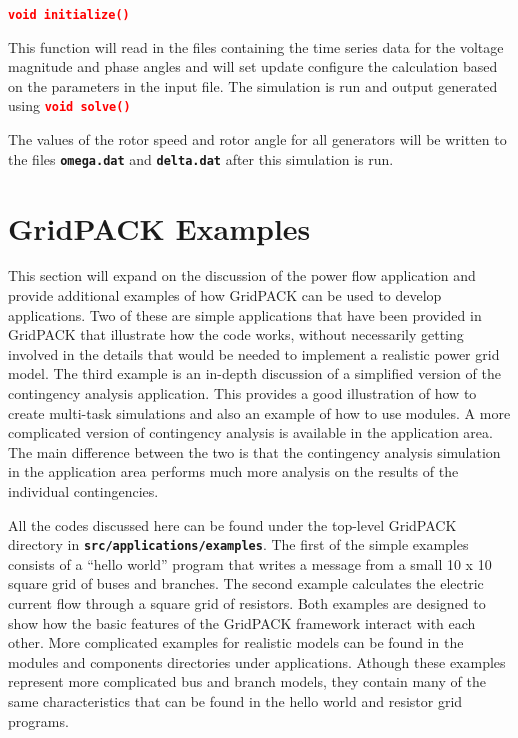 \documentclass[12pt]{report} %
\begin{document}
\textcolor{red}{\texttt{\textbf{void initialize()}}}

This function will read in the files containing the time series data for the voltage magnitude and phase angles and will set update configure the calculation based on the parameters in the input file. The simulation is run and output generated using
\textcolor{red}{\texttt{\textbf{void solve()}}}

The values of the rotor speed and rotor angle for all generators will be written to the files \texttt{\textbf{omega.dat}} and \texttt{\textbf{delta.dat}} after this simulation is run.

\section{GridPACK Examples}

This section will expand on the discussion of the power flow application and provide additional examples of how GridPACK can be used to develop applications. Two of these are simple applications that have been provided in GridPACK that illustrate how the code works, without necessarily getting involved in the details that would be needed to implement a realistic power grid model. The third example is an in-depth discussion of a simplified version of the contingency analysis application. This provides a good illustration of how to create multi-task simulations and also an example of how to use modules. A more complicated version of contingency analysis is available in the application area. The main difference between the two is that the contingency analysis simulation in the application area performs much more analysis on the results of the individual contingencies.

All the codes discussed here can be found under the top-level GridPACK directory in \texttt{\textbf{src/applications/examples}}.
The first of the simple examples consists of a ``hello world'' program that writes a message from a small 10 x 10 square grid of buses and branches. The second example calculates the electric current flow through a square grid of resistors. Both examples are designed to show how the basic features of the GridPACK framework interact with each other. More complicated examples for realistic models can be found in the modules and components directories under applications. Athough these examples represent more complicated bus and branch models, they contain many of the same characteristics that can be found in the hello world and resistor grid programs.
\end{document}
